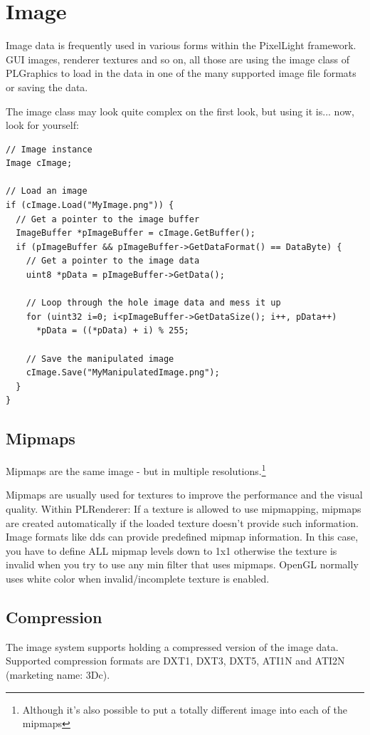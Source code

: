\section{Image}
Image data is frequently used in various forms within the PixelLight framework. GUI images, renderer textures and so on, all those are using the image class of PLGraphics to load in the data in one of the many supported image file formats or saving the data.

The image class may look quite complex on the first look, but using it is... now, look for yourself:

\begin{lstlisting}[caption=Image usage]
// Image instance
Image cImage;

// Load an image
if (cImage.Load("MyImage.png")) {
  // Get a pointer to the image buffer
  ImageBuffer *pImageBuffer = cImage.GetBuffer();
  if (pImageBuffer && pImageBuffer->GetDataFormat() == DataByte) {
    // Get a pointer to the image data
    uint8 *pData = pImageBuffer->GetData();

    // Loop through the hole image data and mess it up
    for (uint32 i=0; i<pImageBuffer->GetDataSize(); i++, pData++)
      *pData = ((*pData) + i) % 255;

    // Save the manipulated image
    cImage.Save("MyManipulatedImage.png");
  }
}
\end{lstlisting}




\subsection{Mipmaps}
Mipmaps are the same image - but in multiple resolutions.\footnote{Although it's also possible to put a totally different image into each of the mipmaps}

Mipmaps are usually used for textures to improve the performance and the visual quality.
Within PLRenderer: If a texture is allowed to use mipmapping, mipmaps are created automatically if the loaded texture doesn't provide such information. Image formats like dds can provide predefined mipmap information. In this case, you have to define ALL mipmap levels down to 1x1 otherwise the texture is invalid when you try to use any min filter that uses mipmaps. OpenGL normally uses white color when invalid/incomplete texture is enabled.




\subsection{Compression}
The image system supports holding a compressed version of the image data. Supported compression formats are DXT1, DXT3, DXT5, ATI1N and ATI2N (marketing name: 3Dc).

